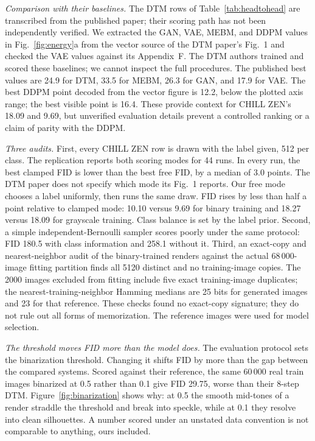 \documentclass[reprint,amsmath,amssymb,aps,nofootinbib]{revtex4-2}
\begin{document}
\emph{Comparison with their baselines.} The DTM rows of
Table~\ref{tab:headtohead} are transcribed from the published paper;
their scoring path has not been independently verified. We extracted the GAN, VAE, MEBM, and DDPM values in
Fig.~\ref{fig:energy}a from the vector source of the DTM paper's Fig.~1
and checked the VAE values against its Appendix~F. The DTM authors
trained and scored these baselines; we cannot inspect the full
procedures. The published best values are 24.9 for DTM, 33.5 for MEBM, 26.3
for GAN, and 17.9 for VAE. The best DDPM point decoded from the vector
figure is 12.2, below the plotted axis range; the best visible point
is 16.4. These provide context for CHILL ZEN's 18.09 and 9.69, but
unverified evaluation details prevent a controlled ranking or a claim
of parity with the DDPM.

\emph{Three audits.} First, every CHILL ZEN row is drawn with the label
given, 512 per class. The replication reports both scoring modes for 44 runs. In every run,
the best clamped FID is lower than the best free FID, by a median of 3.0
points. The DTM paper does not specify which mode its Fig.~1 reports. Our free mode chooses a label uniformly, then runs the same draw. FID
rises by less than half a point relative to clamped mode: 10.10 versus
9.69 for binary training and 18.27 versus 18.09 for grayscale training.
Class balance is set by the label prior. Second, a simple independent-Bernoulli sampler scores poorly under the
same protocol: FID 180.5 with class information and 258.1 without it. Third, an exact-copy and nearest-neighbor audit of the binary-trained
renders against the actual 68\,000-image fitting partition finds
all 5120 distinct and no training-image copies. The 2000 images
excluded from fitting include five exact training-image duplicates;
the nearest-training-neighbor Hamming medians are 25 bits for
generated images and 23 for that reference. These checks found no
exact-copy signature; they do not rule out all forms of memorization.
The reference images were used for model selection.

\emph{The threshold moves FID more than the model does.} The evaluation protocol sets the binarization threshold. Changing it
shifts FID by more than the gap between the compared systems.
Scored against their reference, the same 60\,000 real train images
binarized at 0.5 rather than 0.1 give FID 29.75, worse than their
8-step DTM. Figure~\ref{fig:binarization} shows why: at 0.5 the smooth
mid-tones of a render straddle the threshold and break into speckle,
while at 0.1 they resolve into clean silhouettes. A number scored under
an unstated data convention is not comparable to anything, ours
included.
\end{document}
